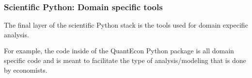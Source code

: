 \documentclass[
    xcolor={svgnames,dvipsnames},
    hyperref={colorlinks, citecolor=DeepPink4, linkcolor=DarkRed, urlcolor=DarkBlue}
]{beamer}  %
\newcommand{\1}{\mathbbm 1}
\begin{document}
\begin{frame}
    \frametitle{Scientific Python: Domain specific tools}

    The final layer of the scientific Python stack is the tools used for domain expecific
    analysis.

    For example, the code inside of the QuantEcon Python package is all domain specific code and is
    meant to facilitate the type of analysis/modeling that is done by economists.

\end{frame}
\end{document}
